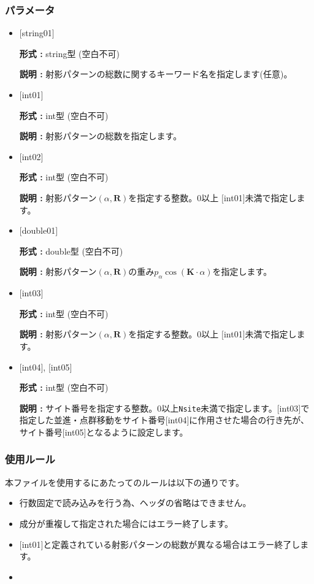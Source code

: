 \subsubsection{パラメータ}
 \begin{itemize}

   \item  $[$string01$]$
   
    {\bf 形式 :} string型 (空白不可)

   {\bf 説明 :} 射影パターンの総数に関するキーワード名を指定します(任意)。

   \item  $[$int01$]$
   
    {\bf 形式 :} int型 (空白不可)

   {\bf 説明 :} 射影パターンの総数を指定します。

  \item  $[$int02$]$
   
 {\bf 形式 :} int型 (空白不可)

{\bf 説明 :} 射影パターン$(\alpha, {\bm R})$を指定する整数。0以上 $[$int01$]${未満}で指定します。
 
  \item  $[$double01$]$
   
 {\bf 形式 :} double型 (空白不可)

{\bf 説明 :} 射影パターン$(\alpha, {\bm R})$の重み$p_{\alpha}\cos ({\bm K}\cdot \alpha)$を指定します。
 
 \item  $[$int03$]$
   
   {\bf 形式 :} int型 (空白不可)

  {\bf 説明 :} 射影パターン$(\alpha, {\bm R})$を指定する整数。0以上 $[$int01$]${未満}で指定します。

 \item  $[$int04$]$, $[$int05$]$
   
   {\bf 形式 :} int型 (空白不可)

  {\bf 説明 :} サイト番号を指定する整数。0以上\verb|Nsite|{未満}で指定します。$[$int03$]$で指定した並進・点群移動をサイト番号$[$int04$]$に作用させた場合の行き先が、サイト番号$[$int05$]$となるように設定します。

\end{itemize}

\subsubsection{使用ルール}
本ファイルを使用するにあたってのルールは以下の通りです。
\begin{itemize}
\item 行数固定で読み込みを行う為、ヘッダの省略はできません。
\item 成分が重複して指定された場合にはエラー終了します。
\item $[$int01$]$と定義されている射影パターンの総数が異なる場合はエラー終了します。
\item {}
\end{itemize}

